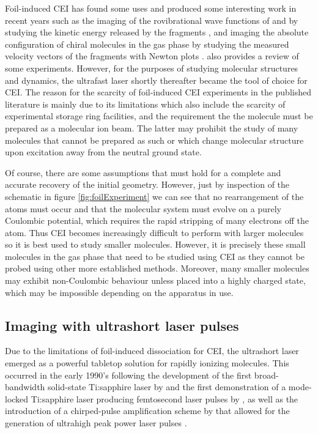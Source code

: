 Foil-induced CEI has found some uses and produced some interesting work in 
recent years such as the imaging of the rovibrational wave functions of  and  by studying the kinetic energy released by the fragments \citep{Jordon-Thaden11, Herwig13PRA}, and imaging the absolute configuration of chiral molecules in the gas phase by studying the measured velocity vectors of the fragments with Newton plots \citep{Herwig13}. \citet{Vager01} also provides a review of some experiments. However, for the purposes of studying molecular structures and dynamics, the ultrafast laser shortly thereafter became the tool of choice for CEI. The reason for the scarcity of foil-induced CEI experiments in the published literature is mainly due to its limitations which also include the scarcity of experimental storage ring facilities, and the requirement the the molecule must be prepared as a molecular ion beam. The latter may prohibit the study of many molecules that cannot be prepared as such or which change molecular structure upon excitation away from the neutral ground state.

Of course, there are some assumptions that must hold for a complete and accurate recovery of the initial geometry. However, just by inspection of the schematic in figure \ref{fig:foilExperiment} we can see that no rearrangement of the atoms must occur and that the molecular system must evolve on a purely Coulombic potential, which requires the rapid stripping of many electrons off the atom. Thus CEI becomes increasingly difficult to perform with larger molecules so it is best used to study smaller molecules. However, it is precisely these small molecules in the gas phase that need to be studied using CEI as they cannot be probed using other more established methods. Moreover, many smaller molecules may exhibit non-Coulombic behaviour unless placed into a highly charged state, which may be impossible depending on the apparatus in use.

\subsection{Imaging with ultrashort laser pulses}\label{sec:laserCEI}
Due to the limitations of foil-induced dissociation for CEI, the ultrashort laser emerged as a powerful tabletop solution for rapidly ionizing molecules. This occurred in the early 1990's following the development of the first broad-bandwidth solid-state Ti:sapphire laser by \citet{Moulton86} and the first demonstration of a mode-locked Ti:sapphire laser producing femtosecond laser pulses by \citet{Spence91}, as well as the introduction of a chirped-pulse amplification scheme by \citet{Strickland85} that allowed for the generation of ultrahigh peak power laser pulses \citep{Maine88}.

